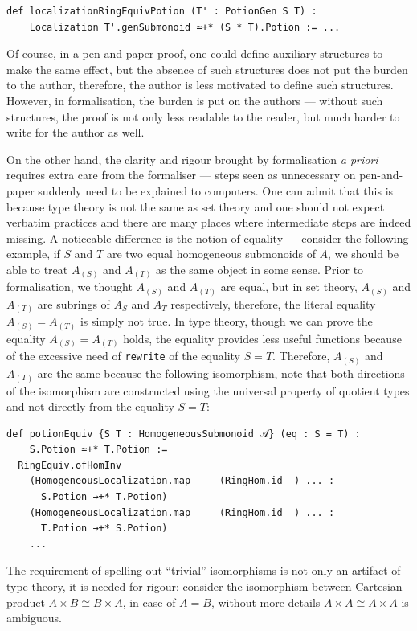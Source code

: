\documentclass[graybox]{svmult}
\begin{document}
\begin{lstlisting}
def localizationRingEquivPotion (T' : PotionGen S T) :
    Localization T'.genSubmonoid ≃+* (S * T).Potion := ...
\end{lstlisting}
Of course, in a pen-and-paper proof, one could define auxiliary structures to make the same effect, 
but the absence of such structures does not put the burden to the author, therefore, the author is 
less motivated to define such structures. However, in formalisation, 
the burden is put on the authors --- without such structures, the proof is not only less readable to the reader, but much harder to write for the author as well.

On the other hand, the clarity and rigour brought by formalisation \textit{a priori} requires extra 
care from the formaliser --- steps seen as unnecessary on pen-and-paper suddenly need to 
be explained to computers. One can admit that this is because type theory is not the same as set theory and 
one should not expect verbatim practices and there are many places where intermediate steps are indeed missing.
A noticeable difference is the notion of equality --- consider the following example, if $S$ and $T$ are two equal homogeneous submonoids of $A$, 
we should be able to treat $A_{(S)}$ and $A_{(T)}$ as the same object in some sense. 
Prior to formalisation, we thought $A_{(S)}$ and $A_{(T)}$ are equal, but in set theory, $A_{(S)}$ and $A_{(T)}$ are subrings of $A_S$ and $A_T$ respectively,  
therefore, the literal equality $A_{(S)} = A_{(T)}$ is simply not true. 
In type theory, though we can prove the equality $A_{(S)} = A_{(T)}$ holds, the equality provides less useful functions because of the excessive need of \lstinline|rewrite| of the equality $S = T$.
Therefore, $A_{(S)}$ and $A_{(T)}$ are the same because the following isomorphism, note that both directions of the isomorphism are constructed
using the universal property of quotient types and not directly from the equality $S = T$:

\begin{lstlisting}
def potionEquiv {S T : HomogeneousSubmonoid 𝒜} (eq : S = T) : 
    S.Potion ≃+* T.Potion := 
  RingEquiv.ofHomInv
    (HomogeneousLocalization.map _ _ (RingHom.id _) ... : 
      S.Potion →+* T.Potion)
    (HomogeneousLocalization.map _ _ (RingHom.id _) ... : 
      T.Potion →+* S.Potion)
    ...
\end{lstlisting}

The requirement of spelling out ``trivial'' isomorphisms is not only an artifact of type theory, 
it is needed for rigour: consider the isomorphism between Cartesian product $A \times B \cong B \times A$, in case of $A = B$,
without more details $A \times A \cong A \times A$ is ambiguous. 
\end{document}
